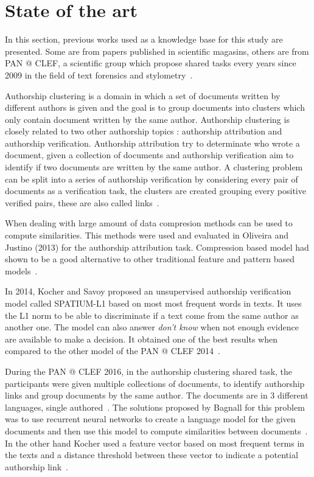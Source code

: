 \section{State of the art \label{sec:state_of_the_art}}

In this section, previous works used as a knowledge base for this study are presented. Some are from papers published in scientific magasins, others are from PAN @ CLEF, a scientific group which propose shared tasks every years since 2009 in the field of text forensics and stylometry~\cite{pan_webis}.

Authorship clustering is a domain in which a set of documents written by different authors is given and the goal is to group documents into clusters which only contain document written by the same author.
Authorship clustering is closely related to two other authorship topics : authorship attribution and authorship verification.
Authorship attribution try to determinate who wrote a document, given a collection of documents and authorship verification aim to identify if two documents are written by the same author.
A clustering problem can be split into a series of authorship verification by considering every pair of documents as a verification task, the clusters are created grouping every positive verified pairs, these are also called links~\cite{pan16_clustering_site}.

When dealing with large amount of data compresion methods can be used to compute similarities.
This methods were used and evaluated in Oliveira and Justino (2013) for the authorship attribution task.
Compression based model had shown to be a good alternative to other traditional feature and pattern based models~\cite{comparing_compression}.

In 2014, Kocher and Savoy proposed an unsupervised authorship verification model called \textsc{SPATIUM-L1} based on most most frequent words in texts. It uses the L1 norm to be able to discriminate if a text come from the same author as another one.
The model can also answer \textit{don't know} when not enough evidence are available to make a decision.
It obtained one of the best results when compared to the other model of the PAN @ CLEF 2014~\cite{kocher_linking}.

During the PAN @ CLEF 2016, in the authorship clustering shared task, the participants were given multiple collections of documents, to identify authorship links and group documents by the same author.
The documents are in 3 different languages, single authored~\cite{pan16}.
The solutions proposed by Bagnall for this problem was to use recurrent neural networks to create a language model for the given documents and then use this model to compute similarities between documents~\cite{bagnall_pan16}.
In the other hand Kocher used a feature vector based on most frequent terms in the texts and a distance threshold between these vector to indicate a potential authorship link~\cite{kocher_pan16}.

